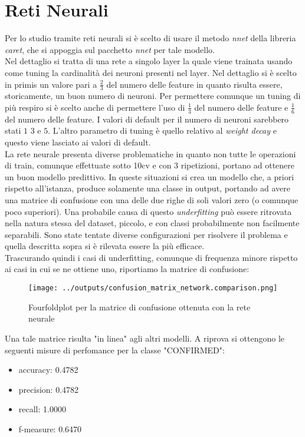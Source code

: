 \section{Reti Neurali}
Per lo studio tramite reti neurali si è scelto di usare il metodo \textit{nnet} 
della libreria \textit{caret}, che si appoggia sul pacchetto \textit{nnet} per 
tale modello.\\
Nel dettaglio si tratta di una rete a singolo layer la quale viene trainata 
usando come tuning la cardinalità dei neuroni presenti nel layer. Nel dettaglio
si è scelto in primis un valore pari a $\frac{2}{3}$ del numero delle feature 
in quanto risulta essere, storicamente, un buon numero di neuroni. Per 
permettere comunque un tuning di più respiro si è scelto anche di permettere
l'uso di $\frac{1}{3}$ del numero delle feature e $\frac{1}{6}$ del numero delle 
feature. I valori di default per il numero di neuroni sarebbero stati $1$ $3$ e 
$5$. L'altro parametro di tuning è quello relativo al \textit{weight decay}
e questo viene lasciato ai valori di default.\\
La rete neurale presenta diverse problematiche in quanto non tutte le operazioni
di train, comunque effettuate sotto 10cv e con 3 ripetizioni, portano ad 
ottenere un buon modello predittivo. In queste situazioni si crea un modello 
che, a priori rispetto all'istanza, produce solamente una classe in output, 
portando ad avere una matrice di confusione con una delle due righe di soli 
valori zero (o comunque poco superiori). Una probabile causa di questo
\textit{underfitting} può essere ritrovata nella natura stessa del dataset, 
piccolo, e con classi probabilmente non facilmente separabili. 
Sono state tentate diverse configurazioni per risolvere il problema e quella 
descritta sopra si è rilevata essere la più efficace.\\
Trascurando quindi i casi di underfitting, comunque 
di frequenza minore rispetto ai casi in cui se ne ottiene uno, riportiamo 
la matrice di confusione:
\begin{figure}[H]
    \centering
    \texttt{[image: ../outputs/confusion\_matrix\_network.comparison.png]}
    \caption{Fourfoldplot per la matrice di confusione ottenuta con la rete neurale}
\end{figure}
Una tale matrice risulta "in linea" agli altri modelli. 
A riprova si ottengono le seguenti misure di perfomance per la classe 
"CONFIRMED":
\begin{itemize}
    \item accuracy: 0.4782
    \item precision: 0.4782
    \item recall: 1.0000
    \item f-measure: 0.6470
\end{itemize}
